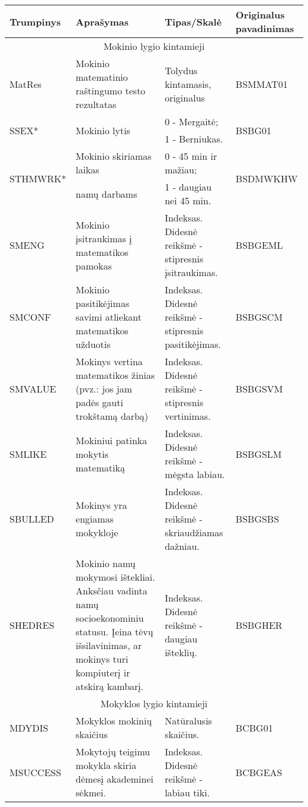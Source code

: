 \documentclass[11pt,a4paper]{article}
\begin{document}
\begin{small}
\begin{longtable}{| p{} | p{5cm} | p{5cm} | p{2.1 cm} |}
\hline
\multirow{2}{*}{Trumpinys} & \multirow{2}{*}{Aprašymas} & \multirow{2}{*}{Tipas/Skalė} & Originalus pavadinimas \\ \hline
\multicolumn{4}{|c|}{Mokinio lygio kintamieji} \\
\hline
MatRes & Mokinio matematinio raštingumo testo rezultatas & Tolydus kintamasis, originalus & BSMMAT01\\ \hline
\multirow{2}{*}{SSEX*} & \multirow{2}{*}{Mokinio lytis} & 0 - Mergaitė; & \multirow{2}{*}{BSBG01}\\
& & 1 - Berniukas. & \\ \hline
\multirow{2}{*}{STHMWRK*} & Mokinio skiriamas laikas & 0 - 45 min ir mažiau; & \multirow{2}{*}{BSDMWKHW}\\
& namų darbams & 1 - daugiau nei 45 min. & \\ \hline
SMENG & Mokinio įsitraukimas į matematikos pamokas & Indeksas. Didesnė reikšmė - stipresnis įsitraukimas. & BSBGEML\\ \hline
SMCONF & Mokinio pasitikėjimas savimi atliekant matematikos užduotis & Indeksas. Didesnė reikšmė - stipresnis pasitikėjimas. & BSBGSCM\\ \hline
SMVALUE & Mokinys vertina matematikos žinias (pvz.: jos jam padės gauti trokštamą darbą) & Indeksas. Didesnė reikšmė - stipresnis vertinimas. & BSBGSVM\\ \hline
SMLIKE & Mokiniui patinka mokytis matematiką & Indeksas. Didesnė reikšmė - mėgsta labiau. &BSBGSLM\\ \hline
SBULLED & Mokinys yra engiamas mokykloje & Indeksas. Didesnė reikšmė - skriaudžiamas dažniau. &BSBGSBS\\ \hline
SHEDRES & Mokinio namų mokymosi ištekliai. Anksčiau vadinta namų socioekonominiu statusu. Įeina tėvų išsilavinimas, ar mokinys turi kompiuterį ir atskirą kambarį. & Indeksas. Didesnė reikšmė - daugiau išteklių. &BSBGHER\\ \hline
\multicolumn{4}{|c|}{Mokyklos lygio kintamieji} \\
\hline
MDYDIS & Mokyklos mokinių skaičius & Natūralusis skaičius. & BCBG01\\ \hline
MSUCCESS & Mokytojų teigimu mokykla skiria dėmesį akademinei sėkmei. & Indeksas. Didesnė reikšmė - labiau tiki. &BCBGEAS\\ \hline

\end{longtable}
\end{small}
\end{document}
